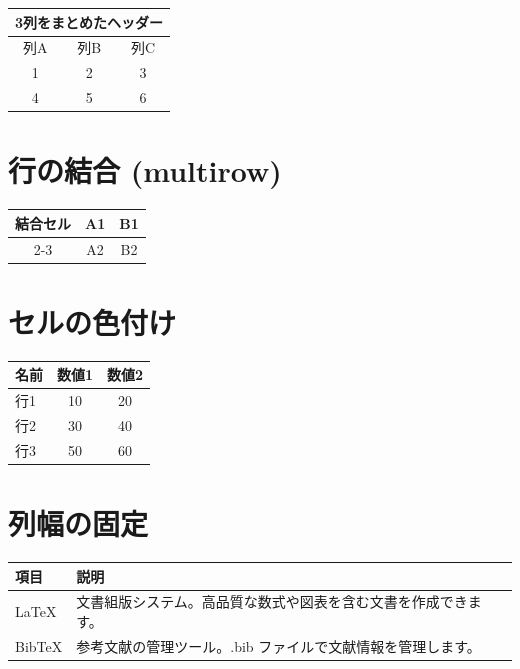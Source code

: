 \documentclass[lualatex,ja=standard]{bxjsarticle}
\begin{document}
\begin{tabular}{|c|c|c|}
  \hline
  \multicolumn{3}{|c|}{3列をまとめたヘッダー} \\
  \hline
  列A & 列B & 列C \\
  \hline
  1   & 2   & 3 \\
  4   & 5   & 6 \\
  \hline
\end{tabular}

\section{行の結合 (multirow)}

\begin{tabular}{|c|c|c|}
  \hline
  \multirow{2}{*}{結合セル} & A1 & B1 \\
  \cline{2-3}
                            & A2 & B2 \\
  \hline
\end{tabular}

\section{セルの色付け}

\begin{tabular}{|l|c|c|}
  \hline
  \rowcolor{gray!30} 名前 & 数値1 & 数値2 \\
  \hline
  行1 & \cellcolor{yellow!50} 10 & 20 \\
  行2 & 30 & \cellcolor{cyan!30} 40 \\
  行3 & 50 & 60 \\
  \hline
\end{tabular}

\section{列幅の固定}

\begin{tabular}{|l|p{6cm}|}
  \hline
  項目   & 説明 \\
  \hline
  LaTeX  & 文書組版システム。高品質な数式や図表を含む文書を作成できます。 \\
  BibTeX & 参考文献の管理ツール。.bib ファイルで文献情報を管理します。 \\
  \hline
\end{tabular}
\end{document}
